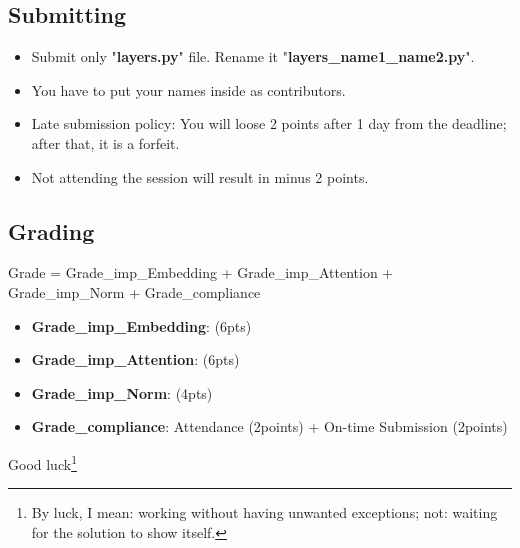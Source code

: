 \documentclass{../../../extra/aakpract/aakpract}
\begin{document}
\subsection{Submitting}

\begin{itemize}
	\item Submit only "\textbf{layers.py}" file.
	Rename it "\textbf{layers\_name1\_name2.py}".
	\item You have to put your names inside as contributors.
	\item Late submission policy: You will loose 2 points after 1 day from the deadline; after that, it is a forfeit.
	\item Not attending the session will result in minus 2 points.
\end{itemize}

\subsection{Grading}

Grade = Grade\_imp\_Embedding + Grade\_imp\_Attention + Grade\_imp\_Norm + Grade\_compliance
	\begin{itemize}
		\item \textbf{Grade\_imp\_Embedding}: (6pts)
		\item \textbf{Grade\_imp\_Attention}: (6pts)
		\item \textbf{Grade\_imp\_Norm}: (4pts)
		\item \textbf{Grade\_compliance}: Attendance (2points) + On-time Submission (2points)
	\end{itemize}

\begin{flushright}
	Good luck\footnote{By luck, I mean: working without having unwanted exceptions; not: waiting for the solution to show itself.}
\end{flushright}
\end{document}
